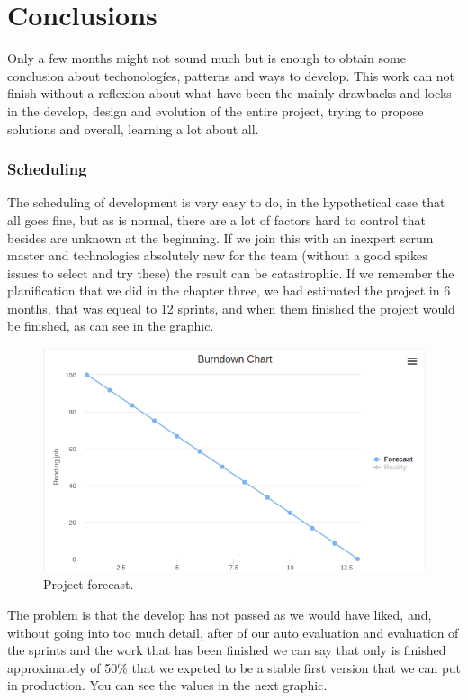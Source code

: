 \chapter{Conclusions}

Only a few months might not sound much but is enough to obtain some
conclusion about techonologíes, patterns and ways to develop.
\intro
This work can not finish without a reflexion about what have been the mainly
drawbacks and locks in the develop, design and evolution of the entire project,
trying to propose solutions and overall, learning a lot about all.

\subsection{Scheduling}

The scheduling of development is very easy to do, in the hypothetical case that
all goes fine, but as is normal, there are a lot of factors hard to control that
besides are unknown at the beginning.
\intro
If we join this with an inexpert scrum master and technologies absolutely new for
the team (without a good spikes issues to select and try these) the result can
be catastrophic.
\intro
If we remember the planification that we did in the chapter three, we had estimated
the project in 6 months, that was equeal to 12 sprints, and when them finished
the project would be finished, as can see in the graphic.

\begin{figure}[H]
  \includegraphics[scale=0.45]{img/graphics/burndown.png}
  \centering
  \caption{Project forecast.}
\end{figure}

\noindent The problem is that the develop has not passed as we would have liked,
and, without going into too much detail, after of our auto evaluation and
evaluation of the sprints and the work that has been finished we can say that
only is finished approximately of 50\% that we expeted to be a stable first version
that we can put in production.
You can see the values in the next graphic.

